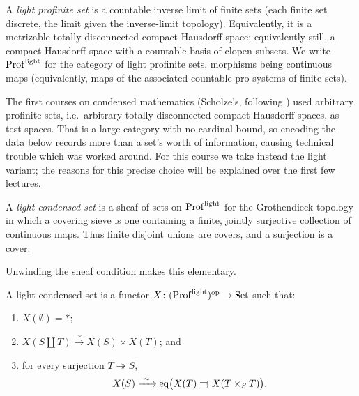 \begin{definition}
\label{def:1:light-profinite}
A \emph{light profinite set} is a countable inverse limit of finite sets (each
finite set discrete, the limit given the inverse-limit topology). Equivalently,
it is a metrizable totally disconnected compact Hausdorff space; equivalently
still, a compact Hausdorff space with a countable basis of clopen subsets. We
write $\mathrm{Prof}^{\mathrm{light}}$ for the category of light profinite sets, morphisms being
continuous maps (equivalently, maps of the associated countable pro-systems of
finite sets).
\end{definition}

\begin{remark}
\label{rmk:1:why-light}
The first courses on condensed mathematics (Scholze's, following
\cite{scholze2019condensed}) used arbitrary profinite sets, i.e.\ arbitrary
totally disconnected compact Hausdorff spaces, as test spaces. That is a large
category with no cardinal bound, so encoding the data below records more than a
set's worth of information, causing technical trouble which was worked around.
For this course we take instead the light variant; the reasons for this precise
choice will be explained over the first few lectures.
\end{remark}

\begin{definition}
\label{def:1:light-condensed}
A \emph{light condensed set} is a sheaf of sets on $\mathrm{Prof}^{\mathrm{light}}$ for the
Grothendieck topology in which a covering sieve is one containing a finite,
jointly surjective collection of continuous maps. Thus finite disjoint unions are
covers, and a surjection is a cover.
\end{definition}

Unwinding the sheaf condition makes this elementary.

\begin{definition}
\label{def:1:light-condensed-explicit}
A light condensed set is a functor $X\colon (\mathrm{Prof}^{\mathrm{light}})^{\mathrm{op}}\to\mathrm{Set}$
such that:
\begin{enumerate}
\item $X(\emptyset)=\ast$;
\item $X(S\amalg T)\xrightarrow{\ \sim\ } X(S)\times X(T)$; and
\item for every surjection $T\twoheadrightarrow S$,
\begin{equation*}
X(S)\xrightarrow{\ \sim\ }\eq\bigl(X(T)\rightrightarrows X(T\times_S T)\bigr).
\end{equation*}
\end{enumerate}
\end{definition}

